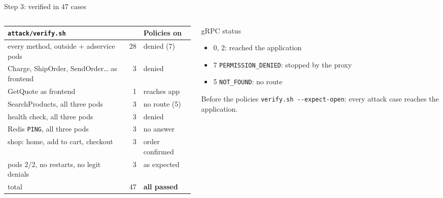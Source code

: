 \documentclass[9pt,aspectratio=169]{beamer}
\begin{document}
\begin{frame}{Step 3: verified in 47 cases}
  \begin{columns}[T,onlytextwidth]
    \begin{column}{0.58\textwidth}
      {\scriptsize
      \begin{tabular}{p{5.0cm}rl}
        \toprule
        \textbf{\texttt{attack/verify.sh}} & & \textbf{Policies on} \\
        \midrule
        every method, outside + adservice pods     & 28 & denied (7) \\
        Charge, ShipOrder, SendOrder\ldots{} as frontend & 3 & denied \\
        GetQuote as frontend                       & 1 & reaches app \\
        SearchProducts, all three pods             & 3 & no route (5) \\
        health check, all three pods               & 3 & denied \\
        Redis \texttt{PING}, all three pods        & 3 & no answer \\
        shop: home, add to cart, checkout          & 3 & order confirmed \\
        pods 2/2, no restarts, no legit denials    & 3 & as expected \\
        \midrule
        total                                      & 47 & \textcolor{AccentGreen}{\textbf{all passed}} \\
        \bottomrule
      \end{tabular}}
    \end{column}
    \begin{column}{0.38\textwidth}
      \begin{block}{gRPC status}
        \begin{itemize}\setlength{\itemsep}{1pt}
          \item 0, 2: reached the application
          \item 7 \texttt{PERMISSION\_DENIED}: stopped by the proxy
          \item 5 \texttt{NOT\_FOUND}: no route
        \end{itemize}
      \end{block}
      \begin{exampleblock}{Before the policies}
        \texttt{verify.sh -{}-expect-open}: every attack case reaches the application.
      \end{exampleblock}
    \end{column}
  \end{columns}
\end{frame}
\end{document}
